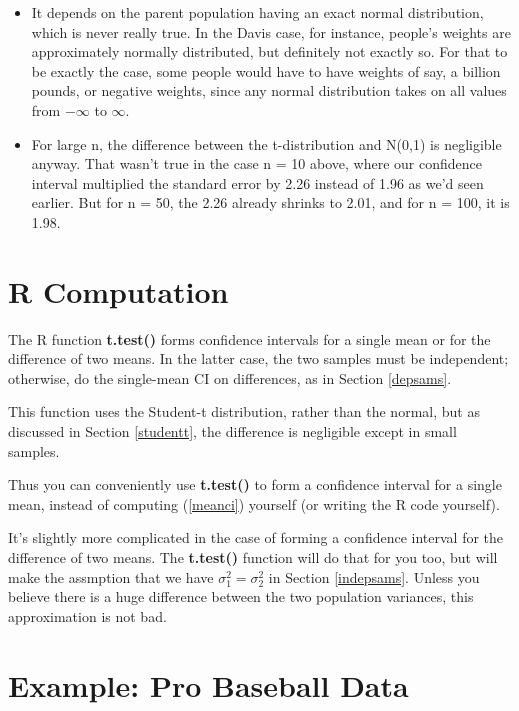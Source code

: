 \begin{itemize}

\item It depends on the parent population having an exact normal
distribution, which is never really true.  In the Davis case, for
instance, people's weights are approximately normally distributed, but
definitely not exactly so.  For that to be exactly the case, some people
would have to have weights of say, a billion pounds, or negative weights,
since any normal distribution takes on all values from $-\infty$ to
$\infty$.

\item For large n, the difference between the t-distribution and N(0,1)
is negligible anyway.  That wasn't true in the case n = 10 above, where
our confidence interval multiplied the standard error by 2.26 instead of
1.96 as we'd seen earlier.  But for n = 50, the 2.26 already shrinks to
2.01, and for n = 100, it is 1.98.

\end{itemize}

\section{R Computation}
\label{rcomp}

The R function {\bf t.test()} forms confidence intervals for a single
mean or for the difference of two means.  In the latter case, the two
samples must be independent; otherwise, do the single-mean CI on
differences, as in Section \ref{depsams}.

This function uses the Student-t distribution, rather than the normal,
but as discussed in Section \ref{studentt}, the difference is negligible
except in small samples.

Thus you can conveniently use {\bf t.test()} to form a confidence
interval for a single mean, instead of computing (\ref{meanci}) yourself
(or writing the R code yourself).

It's slightly more complicated in the case of forming a confidence
interval for the difference of two means.  The {\bf t.test()} function
will do that for you too, but will make the assmption that we have
$\sigma^2_1 = \sigma^2_2$ in Section \ref{indepsams}.  Unless you
believe there is a huge difference between the two population variances,
this approximation is not bad.

\section{Example:  Pro Baseball Data}
\label{baseball0}

